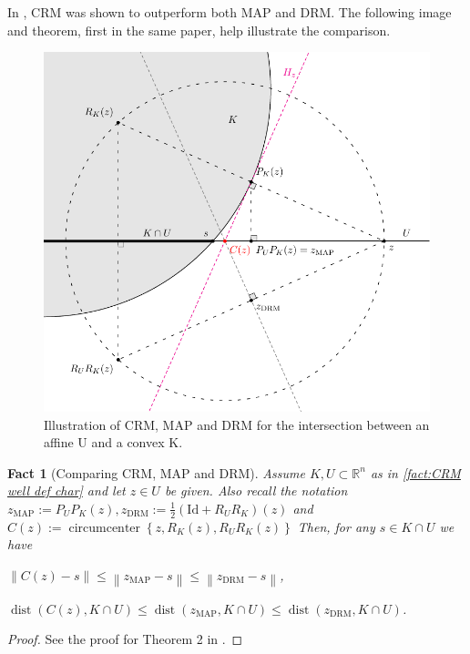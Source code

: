 \documentclass[smallextended,numbook,nospthms]{svjour3}
\theoremstyle{plain}
\newtheorem{fact}[theorem]{Fact}
\theoremstyle{definition}
\def\RR{\mathds R}
\DeclareMathOperator{\dist}{dist}
\begin{document}
In \cite{Behling:2020}, CRM was shown to outperform both MAP and DRM. The following image and theorem, first in the same paper, help illustrate the comparison.

\begin{figure}[h!]
	\centering
	\includegraphics[scale=0.8]{ConvexAffine}
	\caption{Illustration of CRM, MAP and DRM for the intersection between an affine U and a convex K.}
	\label{fig:CRM MAP DRM comp}
\end{figure}

\begin{fact}[Comparing CRM, MAP and DRM]
Assume $K, U \subset \RR^{n}$ as in \cref{fact:CRM well def char} and let $z \in U$ be given. Also recall the notation $z_{\mathrm{MAP}}:=P_{U} P_{K}(z), z_{\mathrm{DRM}}:=\frac{1}{2}\left(\mathrm{Id}+R_{U} R_{K}\right)(z)$ and $C(z):=\operatorname{circumcenter}\left\{z, R_{K}(z), R_{U} R_{K}(z)\right\}$
Then, for any $s \in K \cap U$ we have
\begin{listi}
	\item $\|C(z)-s\| \leq\left\|z_{\mathrm{MAP}}-s\right\| \leq\left\|z_{\mathrm{DRM}}-s\right\|$,
	\item $\dist(C(z), K \cap U) \leq \dist\left(z_{\mathrm{MAP}}, K \cap U\right) \leq \dist\left(z_{\mathrm{DRM}}, K \cap U\right)$.
\end{listi}
\end{fact}
\begin{proof}
	See the proof for Theorem 2 in \cite{Behling:2020}.
\end{proof}
\end{document}
